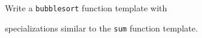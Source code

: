 Write a \texttt{bubblesort} function template with

specializations similar to the \texttt{sum} function template.

